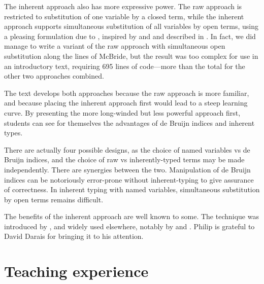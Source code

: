 \documentclass[preprint,authoryear]{elsarticle}
\begin{document}
The inherent approach also has more expressive power.  The raw
approach is restricted to substitution of one variable by a closed
term, while the inherent approach supports simultaneous substitution
of all variables by open terms, using a pleasing formulation due to
\citet{McBride-2005}, inspired by \citet{Goguen-and-McKinna-1997} and
\citet{Altenkirch-and-Reus-1999} and described in
\citet{Allais-et-al-2017}. In fact, we did manage to write a variant of
the raw approach with simultaneous open substitution along the lines
of McBride, but the result was too complex for use in an introductory
text, requiring 695 lines of code---more than the total for the other
two approaches combined.

The text develops both approaches because the raw approach is more
familiar, and because placing the inherent approach first would
lead to a steep learning curve.  By presenting the more long-winded
but less powerful approach first, students can see for themselves the
advantages of de Bruijn indices and inherent types.

There are actually four possible designs, as the choice of named
variables vs de Bruijn indices, and the choice of raw vs
inherently-typed terms may be made independently.  There are synergies
between the two.  Manipulation of de Bruijn indices can be notoriously
error-prone without inherent-typing to give assurance of correctness.
In inherent typing with named variables, simultaneous substitution by
open terms remains difficult.

The benefits of the inherent approach 
are well known to some. The technique was introduced by
\citet{Altenkirch-and-Reus-1999}, and widely used elsewhere,
notably by \citet{Chapman-2009} and \citet{Allais-et-al-2017}.
Philip is grateful to David Darais for bringing it to his attention.


\section{Teaching experience}
\end{document}
